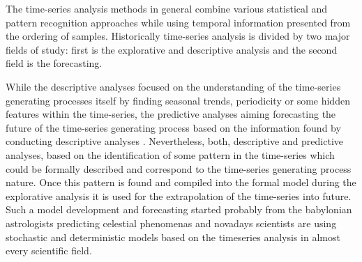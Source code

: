 The time-series analysis methods in general combine various statistical and pattern recognition approaches while using temporal information presented from the ordering of samples. Historically time-series analysis is divided by two major fields of study: first is the explorative and descriptive analysis and the second field is the forecasting. 

While the descriptive analyses focused on the understanding of the time-series generating processes itself by finding seasonal trends, periodicity or some hidden features within the time-series, the predictive analyses aiming forecasting the future of the time-series generating process based on the information found by conducting descriptive analyses \cite{citeulike:3449765}. Nevertheless, both, descriptive and predictive analyses, based on the identification of some pattern in the time-series which could be formally described and correspond to the time-series generating process nature. Once this pattern is found and compiled into the formal model during the explorative analysis it is used for the extrapolation of the time-series into future. Such a model development and forecasting started probably from the babylonian astrologists predicting celestial phenomenas and novadays scientists are using stochastic and deterministic models based on the timeseries analysis in almost every scientific field.